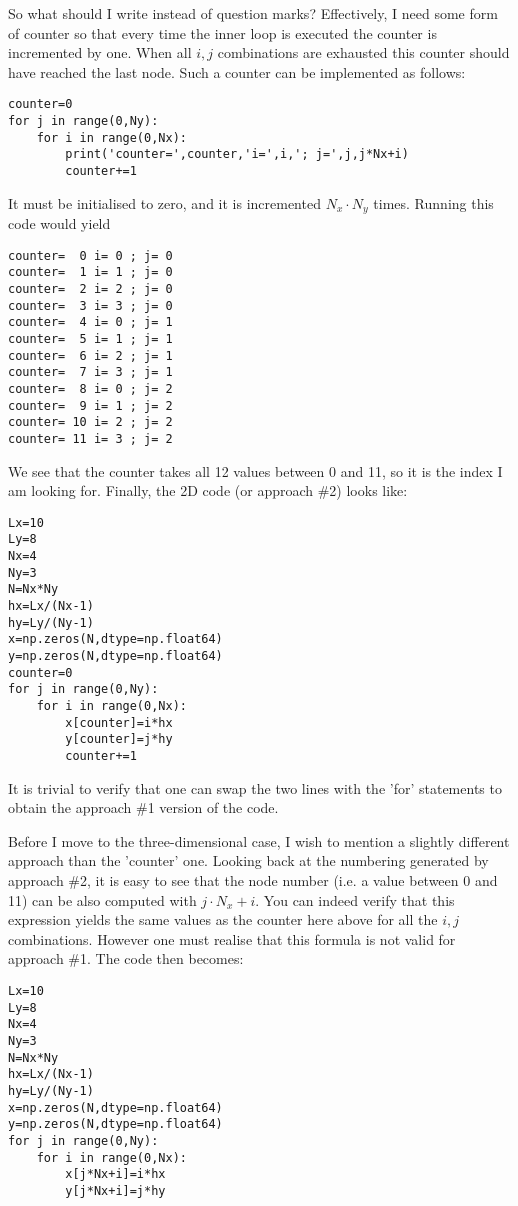 So what should I write instead of question marks? Effectively, I need some form of counter 
so that every time the inner loop is executed the counter is incremented by one. 
When all $i,j$ combinations are exhausted this counter should have reached the 
last node. Such a counter can be implemented as follows:
\begin{lstlisting}
counter=0
for j in range(0,Ny):
    for i in range(0,Nx):
        print('counter=',counter,'i=',i,'; j=',j,j*Nx+i)
        counter+=1
\end{lstlisting}
It must be initialised to zero, and it is incremented $N_x \cdot N_y$ times.
Running this code would yield 
\begin{lstlisting}
counter=  0 i= 0 ; j= 0
counter=  1 i= 1 ; j= 0
counter=  2 i= 2 ; j= 0
counter=  3 i= 3 ; j= 0
counter=  4 i= 0 ; j= 1
counter=  5 i= 1 ; j= 1
counter=  6 i= 2 ; j= 1
counter=  7 i= 3 ; j= 1
counter=  8 i= 0 ; j= 2
counter=  9 i= 1 ; j= 2
counter= 10 i= 2 ; j= 2
counter= 11 i= 3 ; j= 2
\end{lstlisting}
We see that the counter takes all 12 values between 0 and 11, so it is the index I am looking for. Finally, the 2D code (or approach \#2) looks like:
\begin{lstlisting}
Lx=10
Ly=8
Nx=4
Ny=3
N=Nx*Ny
hx=Lx/(Nx-1)
hy=Ly/(Ny-1)
x=np.zeros(N,dtype=np.float64)
y=np.zeros(N,dtype=np.float64)
counter=0
for j in range(0,Ny):
    for i in range(0,Nx):
        x[counter]=i*hx
        y[counter]=j*hy
        counter+=1
\end{lstlisting}
It is trivial to verify that one can swap the two lines with the 'for' statements to obtain the approach \#1 version of the code.

Before I move to the three-dimensional case, I wish to mention a slightly different 
approach than the 'counter' one. 
Looking back at the numbering generated by approach \#2, it is easy to see that the node number (i.e. a value between 0 and 11)
can be also computed with $j\cdot N_x+i$. You can indeed verify that this expression yields the same values as the counter here above for all the $i,j$ combinations. However one must realise that this formula is not valid for approach \#1. The code then becomes:
\begin{lstlisting}
Lx=10
Ly=8
Nx=4
Ny=3
N=Nx*Ny
hx=Lx/(Nx-1)
hy=Ly/(Ny-1)
x=np.zeros(N,dtype=np.float64)
y=np.zeros(N,dtype=np.float64)
for j in range(0,Ny):
    for i in range(0,Nx):
        x[j*Nx+i]=i*hx
        y[j*Nx+i]=j*hy
\end{lstlisting}

